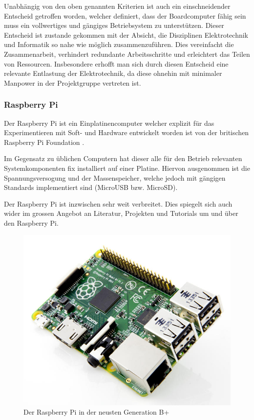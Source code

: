 Unabhängig von den oben genannten Kriterien ist auch ein einschneidender
Entscheid getroffen worden, welcher definiert, dass der Boardcomputer
fähig sein muss ein vollwertiges und gängiges Betriebsystem zu 
unterstützen. Dieser Entscheid ist zustande gekommen mit der Absicht, die
Disziplinen Elektrotechnik und Informatik so nahe wie möglich 
zusammenzuführen. Dies vereinfacht die Zusammenarbeit, verhindert 
redundante Arbeitsschritte und erleichtert das Teilen von Ressourcen.
Insbesondere erhofft man sich durch diesen Entscheid eine relevante 
Entlastung der Elektrotechnik, da diese ohnehin mit minimaler Manpower in
der Projektgruppe vertreten ist.

\subsubsection{Raspberry Pi}
Der Raspberry Pi ist ein Einplatinencomputer welcher explizit für
das Experimentieren mit Soft- und Hardware entwickelt worden ist von
der britischen Raspberry Pi Foundation \cite{RPiFoundation}.

Im Gegensatz zu üblichen Computern hat dieser alle für den Betrieb
relevanten Systemkomponenten fix installiert auf einer Platine. Hiervon
ausgenommen ist die Spannungsversogung und der Massenspeicher, welche
jedoch mit gängigen Standards implementiert sind (MicroUSB bzw. MicroSD).

Der Raspberry Pi ist inzwischen sehr weit verbreitet. Dies spiegelt sich
auch wider im grossen Angebot an Literatur, Projekten und Tutorials um
und über den Raspberry Pi.

\begin{figure}[h!]
	\centering
	\includegraphics[scale=1]{../../fig/raspberry-pi-b-plus.jpg}
	\caption{Der Raspberry Pi in der neusten Generation B+ 
		\protect\cite{cnet}}
\end{figure}

